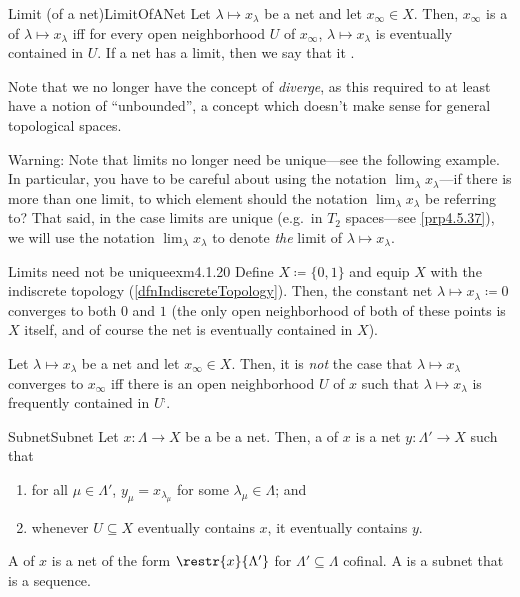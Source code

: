 \begin{dfn}{Limit (of a net)}{LimitOfANet}
Let $\lambda \mapsto x_\lambda$ be a net and let $x_\infty \in X$.  Then, $x_\infty$ is a  of $\lambda \mapsto x_\lambda$ iff for every open neighborhood $U$ of $x_\infty$, $\lambda \mapsto x_{\lambda}$ is eventually contained in $U$.  If a net has a limit, then we say that it .
\begin{rmk}
Note that we no longer have the concept of \emph{diverge}, as this required to at least have a notion of ``unbounded'', a concept which doesn't make sense for general topological spaces.
\end{rmk}
\begin{wrn}
Warning:  Note that limits no longer need be unique---see the following example.  In particular, you have to be careful about using the notation $\lim _{\lambda}x_{\lambda}$---if there is more than one limit, to which element should the notation $\lim _{\lambda}x_{\lambda}$ be referring to?  That said, in the case limits are unique (e.g.\ in $T_2$ spaces---see \cref{prp4.5.37}), we will use the notation $\lim _{\lambda}x_{\lambda}$ to denote \emph{the} limit of $\lambda \mapsto x_{\lambda}$.
\end{wrn}
\end{dfn}
\begin{exm}{Limits need not be unique}{exm4.1.20}
Define $X\coloneqq \{ 0,1\}$ and equip $X$ with the indiscrete topology (\cref{dfnIndiscreteTopology}).  Then, the constant net $\lambda \mapsto x_\lambda \coloneqq 0$ converges to both $0$ and $1$ (the only open neighborhood of both of these points is $X$ itself, and of course the net is eventually contained in $X$).
\end{exm}
\begin{prp}{}{}
Let $\lambda \mapsto x_{\lambda}$ be a net and let $x_{\infty}\in X$.  Then, it is \emph{not} the case that $\lambda \mapsto x_{\lambda}$ converges to $x_{\infty}$ iff there is an open neighborhood $U$ of $x$ such that $\lambda \mapsto x_{\lambda}$ is frequently contained in $U^{\comp}$.
\end{prp}
\begin{dfn}{Subnet}{Subnet}
Let $x:\Lambda \rightarrow X$ be a be a net.  Then, a  of $x$ is a net $y:\Lambda '\rightarrow X$ such that
\begin{enumerate}
\item for all $\mu \in \Lambda '$, $y_\mu =x_{\lambda _\mu}$ for some $\lambda _\mu \in \Lambda$; and
\item whenever $U\subseteq X$ eventually contains $x$, it eventually contains $y$.
\end{enumerate}
A  of $x$ is a net of the form $\restr{x}{\Lambda'}$ for $\Lambda '\subseteq \Lambda$ cofinal.  A  is a subnet that is a sequence.
\end{dfn}
